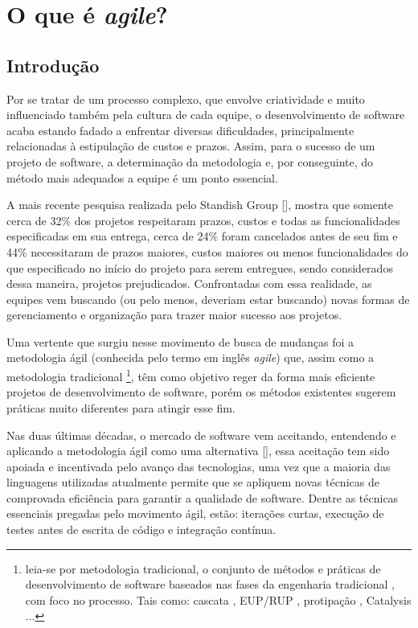 \documentclass[10pt,a4paper,font=plain]{abnt}
\begin{document}
\chapter{O que é \textit{agile}?}

\section {Introdução}

Por se tratar de um processo complexo, que envolve criatividade e muito influenciado também pela cultura de cada equipe, o desenvolvimento de software acaba estando fadado a enfrentar diversas dificuldades, principalmente relacionadas à estipulação de custos e prazos. Assim, para o sucesso de um projeto de software, a determinação da metodologia e, por conseguinte, do método mais adequados a equipe é um ponto essencial.

A mais recente pesquisa realizada pelo Standish Group [], mostra que somente cerca de 32\% dos projetos respeitaram prazos, custos e todas as funcionalidades especificadas em sua entrega, cerca de 24\% foram cancelados antes de seu fim e 44\% necessitaram de prazos maiores, custos maiores ou menos funcionalidades do que especificado no início do projeto para serem entregues, sendo considerados dessa maneira, projetos prejudicados. Confrontadas com essa realidade, as equipes vem buscando (ou pelo menos, deveriam estar buscando) novas formas de gerenciamento e organização para trazer maior sucesso aos projetos.

Uma vertente que surgiu nesse movimento de busca de mudanças foi a metodologia ágil (conhecida pelo termo em inglês \textit{agile}) que, assim como a metodologia tradicional \footnote{leia-se por metodologia tradicional, o conjunto de métodos e práticas de desenvolvimento de software baseados nas fases da engenharia tradicional \cite{Pressman}, com foco no processo. Tais como: cascata \cite{Cascata}, EUP/RUP \cite{EUP}, protipação \cite{Prototipacao}, Catalysis \cite{Catalysis} ...}, têm como objetivo reger da forma mais eficiente projetos de desenvolvimento de software, porém os métodos existentes sugerem práticas muito diferentes para atingir esse fim.

Nas duas últimas décadas, o mercado de software vem aceitando, entendendo e aplicando a metodologia ágil como uma alternativa [], essa aceitação tem sido apoiada e incentivada pelo avanço das tecnologias, uma vez que a maioria das linguagens utilizadas atualmente permite que se apliquem novas técnicas de comprovada eficiência para garantir a qualidade de software. Dentre as técnicas essenciais pregadas pelo movimento ágil, estão: iterações curtas, execução de testes antes de escrita de código e integração contínua.
\end{document}
